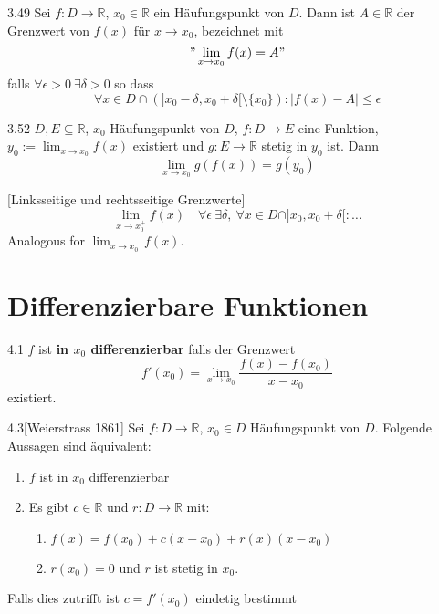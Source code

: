 \documentclass[8pt,a4paper,twocolumn,table]{extarticle}
\newcommand{\R}{\mathbb{R}}
\begin{document}
\begin{definition}{3.49}
    Sei $f: D \to \R$, $x_0 \in \R$ ein Häufungspunkt von $D$. Dann ist $A \in \R$ der Grenzwert von $f(x)$ für $x \to x_0$, bezeichnet mit
    \[ " \lim_{x \to x_0} f(x) = A " \]
    falls $\forall \epsilon > 0\ \exists \delta > 0$ so dass
    \[ \forall x \in D \cap \left(  ]x_0 - \delta, x_0 + \delta[ \setminus \{x_0\}  \right) : |f(x) - A| \le \epsilon \]
\end{definition}

\begin{satz}{3.52}
    $D, E \subseteq \R$, $x_0$ Häufungspunkt von $D$, $f: D \to E$ eine Funktion, $y_0 := \lim_{x \to x_0} f(x)$ existiert und $g: E \to \R$ stetig in $y_0$ ist.
    Dann \[ \lim_{x \to x_0} g(f(x)) = g(y_0) \]
\end{satz}

\begin{definition}{}[Linksseitige und rechtsseitige Grenzwerte]
    \[ \lim_{x \to x_0^+} f(x) \quad \forall \epsilon\ \exists \delta,\ \forall x \in D \cap ]x_0, x_0 + \delta[: \dots \]
    Analogous for $\lim_{x \to x_0^-} f(x)$.
\end{definition}

\section{Differenzierbare Funktionen}

\begin{definition}{4.1}
    $f$ ist \textbf{in $x_0$ differenzierbar} falls der Grenzwert
    \[ f'(x_0) = \lim_{x \to x_0} \frac{f(x) - f(x_0)}{x - x_0} \]
    existiert.
\end{definition}

\begin{satz}{4.3}[Weierstrass 1861]
    Sei $f: D \to \R$, $x_0 \in D$ Häufungspunkt von $D$. Folgende Aussagen sind äquivalent:
    \begin{enumerate}
        \item $f$ ist in $x_0$ differenzierbar
        \item Es gibt $c \in \R$ und $r: D \to \R$ mit:
              \begin{enumerate}
                  \item $f(x) = f(x_0) + c(x - x_0) + r(x)(x - x_0)$
                  \item $r(x_0) = 0$ und $r$ ist stetig in $x_0$.
              \end{enumerate}
    \end{enumerate}

    Falls dies zutrifft ist $c = f'(x_0)$ eindetig bestimmt
\end{satz}
\end{document}
